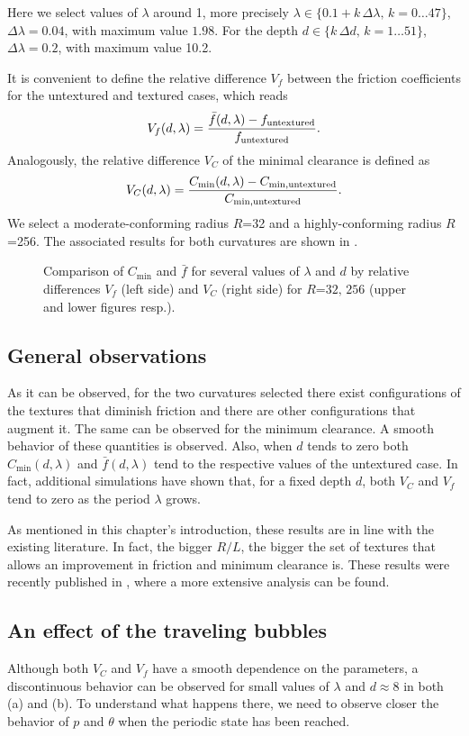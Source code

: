 Here we select values of $\lambda$ around 1, more precisely $\lambda\in \{0.1+k\,\Delta \lambda,\,k=0\ldots 47\}$, $\Delta \lambda=0.04$, with maximum value $1.98$. For the depth $d\in \{k\,\Delta d,\,k=1\ldots 51\}$, $\Delta \lambda=0.2$, with maximum value 10.2.

It is convenient to define the relative difference $V_f$ between the friction coefficients for the untextured and textured cases, which reads
$$V_f(d,\lambda) = \frac{\bar{f}(d,\lambda)-f_{\mbox{\scriptsize{untextured}}}}
{f_{\mbox{\scriptsize{untextured}}}}.$$
Analogously, the relative difference $V_C$ of the minimal clearance is
defined as
$$ V_C(d,\lambda) = \frac{C_{\min}(d,\lambda)-C_{\min,\mbox{\scriptsize{untextured}}}}
{C_{\min,\mbox{\scriptsize{untextured}}}}.$$
We select a moderate-conforming radius $R$=32 and a highly-conforming radius $R$=256. The associated results for both curvatures are shown in .
\begin{figure}[ht]
 \centering 
 \def\svgwidth{\textwidth}	
 \scriptsize{
}
\caption{Comparison of $C_\text{min}$ and $\bar{f}$ for several values of $\lambda$ and $d$ by relative differences $V_f$ (left side) and $V_C$ (right side) for $R$=$32,\,256$ (upper and lower figures resp.).}\label{fig:maps_chap6}
\end{figure}

\subsection{General observations}
As it can be observed, for the two curvatures selected there exist configurations of the textures that diminish friction and there are other configurations that augment it. The same can be observed for the minimum clearance. A smooth behavior of these quantities is observed. Also, when $d$ tends to zero both $C_\text{min}(d,\lambda)$ and $\bar{f}(d,\lambda)$ tend to the respective values of the untextured case. In fact, additional simulations have shown that, for a fixed depth $d$, both $V_C$ and $V_f$ tend to zero as the period $\lambda$ grows.

As mentioned in this chapter's introduction, these results are in line with the existing literature. In fact, the bigger $R/L$, the bigger the set of textures that allows an improvement in friction and minimum clearance is. These results were recently published in \cite{checo2014b}, where a more extensive analysis can be found.

\subsection{An effect of the traveling bubbles}
Although both $V_C$ and $V_f$ have a smooth dependence on the parameters, a discontinuous behavior can be observed for small values of $
\lambda$ and $d\approx 8$ in both (a) and (b). To understand what happens there, we need to observe closer the behavior of $p$ and $\theta$ when the periodic state has been reached.

